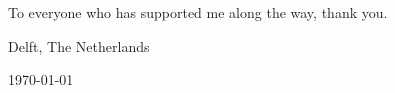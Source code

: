 To everyone who has supported me along the way, thank you.







\vspace{1\baselineskip}

\reportAuthor

\vspace{1\baselineskip}

\noindent
Delft, The Netherlands

\noindent
\today